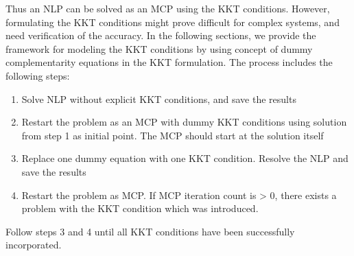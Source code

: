 \documentclass{article}
\begin{document}
\begin{comment}

\begin{equation}
\begin{aligned}
& \bigtriangledown{f(\hat{x})} - \sum_{i=1}^{m} u_{i} \bigtriangledown{g_{i}(\hat{x})}
			- \sum_{k=1}^{p} v_{i} \bigtriangledown{h_{k}(\hat{x})} - \sum_{l=1}^{q} w_{i} \bigtriangledown{d_{l}(\hat{x})} = 0  \\
\\
& h_{k}(\hat{x}) = 0   k = 1,2...p  \\
g_{i}(\hat{x}) \leq 0&	 i = 1,2...m \\  d_{l}(\hat{x}) \geq =0	&	l = 1,2...q
\\
and,\\
<u_{i},g_{i}(x)> = 0 \\ <v_{i},h_{k}(x)> =0 \\  <w_{l},d_{l}(x)> =0
\end{aligned}
\end{equation}

where $<u_{i},g_{i}(x)> = 0$  represent the complimentarily condition and variables u, v, and w represent the marginals of the respective constraint. It is often written as 

 $g_{i}(x) \perp L \leq u \leq U $

where symbol $\perp $(referred to as perpendicular  to) indicates pair-wise complementarity between the function g() and variable u and its bounds. The complimentairy condition essentially 

\end{comment}

Thus an NLP can be solved as an MCP using the KKT conditions. However, formulating the KKT conditions might prove difficult for complex systems, and need verification of the accuracy. In the following sections, we provide the framework for modeling the KKT conditions  by using concept of dummy complementarity equations in the KKT formulation. The process includes the following steps:

\begin{enumerate}
	\item Solve NLP without explicit KKT conditions, and save the results
	\item	 Restart the problem as an MCP with dummy KKT conditions using solution from step 1 as initial point. The MCP should start at the solution itself
	\item Replace one dummy equation with one KKT condition. Resolve the NLP and save the results
	\item Restart the problem as MCP. If MCP iteration count is > 0, there exists a problem with the KKT condition which was introduced.
\end{enumerate}
\noindent Follow steps 3 and 4 until all KKT conditions have been successfully incorporated.
  
\end{document}
